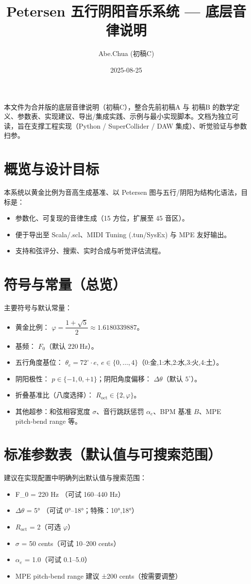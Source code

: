 \documentclass{article}
\title{Petersen 五行阴阳音乐系统 — 底层音律说明}
\author{Abe.Chua (初稿C)}
\date{2025-08-25}
\begin{document}
\maketitle

本文件为合并版的底层音律说明（初稿C），整合先前初稿A 与 初稿B 的数学定义、参数表、实现建议、导出/集成实践、示例与最小实现脚本。文档为独立可读，旨在支撑工程实现（Python / SuperCollider / DAW 集成）、听觉验证与参数扫参。

\section{概览与设计目标}
本系统以黄金比例为音高生成基准、以 Petersen 图与五行/阴阳为结构化语法，目标是：
\begin{itemize}
  \item 参数化、可复现的音律生成（15 方位，扩展至 45 音区）。
  \item 便于导出至 Scala/.scl、MIDI Tuning (.tun/SysEx) 与 MPE 友好输出。
  \item 支持和弦评分、搜索、实时合成与听觉评估流程。
\end{itemize}

\section{符号与常量（总览）}
主要符号与默认常量：
\begin{itemize}
  \item 黄金比例： $\varphi=\dfrac{1+\sqrt{5}}{2}\approx1.6180339887$。
  \item 基频： $F_0$（默认 $220\ \mathrm{Hz}$）。
  \item 五行角度基位： $\theta_e=72^\circ\cdot e,\ e\in\{0,\dots,4\}$（0:金,1:木,2:水,3:火,4:土）。
  \item 阴阳极性： $p\in\{-1,0,+1\}$；阴阳角度偏移： $\Delta\theta$（默认 $5^\circ$）。
  \item 折叠基准比（八度选择）： $R_{\mathrm{oct}}\in\{2,\varphi\}$。
  \item 其他超参：和弦相容宽度 $\sigma$、音行跳跃惩罚 $\alpha_e$、BPM 基准 $B$、MPE pitch‑bend range 等。
\end{itemize}

\section{标准参数表（默认值与可搜索范围）}
建议在实现配置中明确列出默认值与搜索范围：
\begin{itemize}
  \item F\_0 = 220 Hz （可试 160–440 Hz）
  \item $\Delta\theta$ = 5° （可试 0°–18°；特殊：10°,18°）
  \item $R_{\mathrm{oct}}$ = 2（可选 $\varphi$）
  \item $\sigma$ = 50 cents（可试 10–200 cents）
  \item $\alpha_e$ = 1.0（可试 0.1–5.0）
  \item MPE pitch‑bend range 建议 ±200 cents（按需要调整）
\end{itemize}
\end{document}
